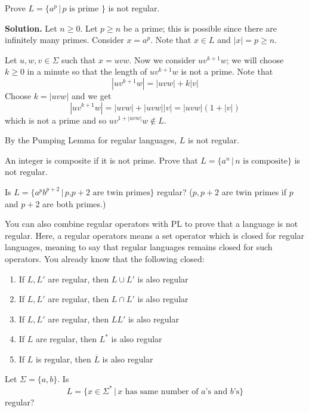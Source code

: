 \newpage
\begin{eg}
Prove $L = \{a^p \,|\, p \text{ is prime } \}$ is not regular.

\textbf{Solution.} Let $n \geq 0$. Let $p \geq n$ be a prime; this is
possible since there are infinitely many primes. Consider $x = a^p$.
Note that $x \in L$ and $|x| = p \geq n$.

Let $u,w,v \in \Sigma$ such that $x = uvw$. Now we consider
$uv^{k+1}w$; we will choose $k\geq 0$ in a minute so that the
length of $uv^{k+1}w$ is not a prime. Note that
\[
 |uv^{k+1}w| = |uvw| + k|v|
\]
Choose $k = |uvw|$ and we get
\[
|uv^{k+1}w| = |uvw| + |uvw||v| = |uvw|(1 + |v|)
\]
which is not a prime and so $uv^{1+|uvw|}w \notin L$.

By the Pumping Lemma for regular languages, $L$ is not regular.
\\
\end{eg}

\newpage
\begin{ex}
An integer is composite if it is not prime. Prove that $L =
\{a^n\,|\, n \text{ is composite} \}$ is not regular.
\end{ex}


\newpage
\begin{ex}
Is $L = \{a^p b^{p+2}\,|\, \text{$p$,$p+2$ are twin primes} \}$ regular?
($p,p+2$ are twin primes if $p$ and $p+2$ are both primes.)
\end{ex}



\newpage
You can also combine regular operators with PL to prove that a language
is not regular.
Here, a regular operators means a set operator which is closed
for regular languages, meaning to say that regular languages remains
closed for such operators.
You already know that the following closed:
\begin{enumerate}[topsep=0mm]
\item If $L,L'$ are regular, then $L \cup L'$ is also regular
\item If $L,L'$ are regular, then $L \cap L'$ is also regular
\item If $L,L'$ are regular, then $LL'$ is also regular
\item If $L$ are regular, then $L^*$ is also regular
\item If $L$ is regular, then $\overline{L}$ is also regular
\end{enumerate}


\begin{eg} Let $\Sigma = \{a,b\}$.
Is 
\[
L = \{ x \in \Sigma^* \,|\, x \text{ has same number of $a$'s
and $b$'s} \}
\]
regular?
\end{eg}

